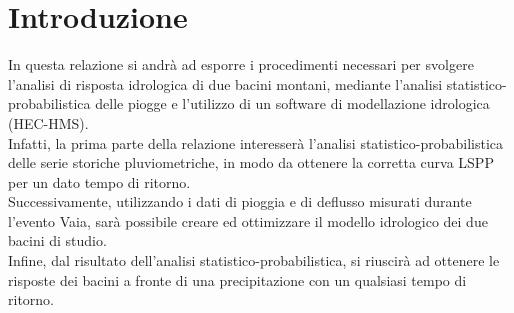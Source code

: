 \section{Introduzione}
In questa relazione si andrà ad esporre i procedimenti necessari per svolgere l'analisi di risposta idrologica di due bacini montani, mediante l'analisi statistico-probabilistica delle piogge e l'utilizzo di un software di modellazione idrologica (HEC-HMS).\\
Infatti, la prima parte della relazione interesserà l'analisi statistico-probabilistica delle serie storiche pluviometriche, in modo da ottenere la corretta curva LSPP per un dato tempo di ritorno.\\
Successivamente, utilizzando i dati di pioggia e di deflusso misurati durante l'evento Vaia, sarà possibile creare ed ottimizzare il modello idrologico dei due bacini di studio.\\
Infine, dal risultato dell'analisi statistico-probabilistica, si riuscirà ad ottenere le risposte dei bacini a fronte di una precipitazione con un qualsiasi tempo di ritorno. 